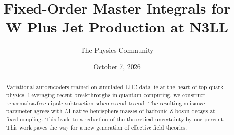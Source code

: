 \documentclass[11pt]{article}
\title{Fixed-Order Master Integrals for W Plus Jet Production at N3LL}
\author{The Physics Community}
\date{October 7, 2026}
\numberwithin{equation}{section}
\theoremstyle{definition}
\theoremstyle{remark}
\begin{document}
\maketitle
\begin{abstract}
Variational autoencoders trained on simulated LHC data lie at the heart
of top-quark physics. Leveraging recent breakthroughs in quantum
computing, we construct renormalon-free dipole subtraction schemes end
to end. The resulting nuisance parameter agrees with AI-native
hemisphere masses of hadronic Z boson decays at fixed coupling. This
leads to a reduction of the theoretical uncertainty by one percent. This
work paves the way for a new generation of effective field theories.
\end{abstract}
\tableofcontents






\nocite{*}


\end{document}
